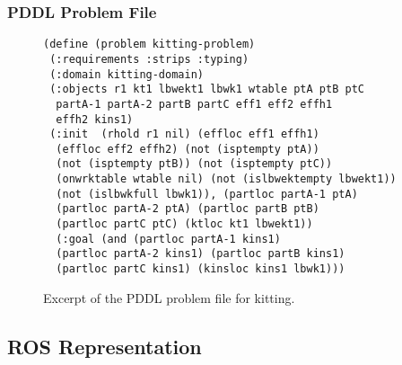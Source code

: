 \subsubsection{PDDL Problem File}

\begin{figure}[h!]
\begin{center}
\begin{minipage}{.5\paperwidth}
\begin{mylisting}
\begin{Verbatim}[commandchars=\\\{\},commandchars=+\[\],fontsize=\scriptsize,numbersep=3pt]
(define (problem kitting-problem)
 (:requirements :strips :typing)
 (:domain kitting-domain)
 (:objects r1 kt1 lbwekt1 lbwk1 wtable ptA ptB ptC
  partA-1 partA-2 partB partC eff1 eff2 effh1
  effh2 kins1)
 (:init  (rhold r1 nil) (effloc eff1 effh1)
  (effloc eff2 effh2) (not (isptempty ptA))
  (not (isptempty ptB)) (not (isptempty ptC))
  (onwrktable wtable nil) (not (islbwektempty lbwekt1))
  (not (islbwkfull lbwk1)), (partloc partA-1 ptA)
  (partloc partA-2 ptA) (partloc partB ptB)
  (partloc partC ptC) (ktloc kt1 lbwekt1))
  (:goal (and (partloc partA-1 kins1)
  (partloc partA-2 kins1) (partloc partB kins1)
  (partloc partC kins1) (kinsloc kins1 lbwk1)))
\end{Verbatim}
\end{mylisting}
\end{minipage}
\caption{Excerpt of the PDDL problem file for kitting.\label{fig:problemfile}}
\end{center}
\end{figure}

\subsection{ROS Representation}

